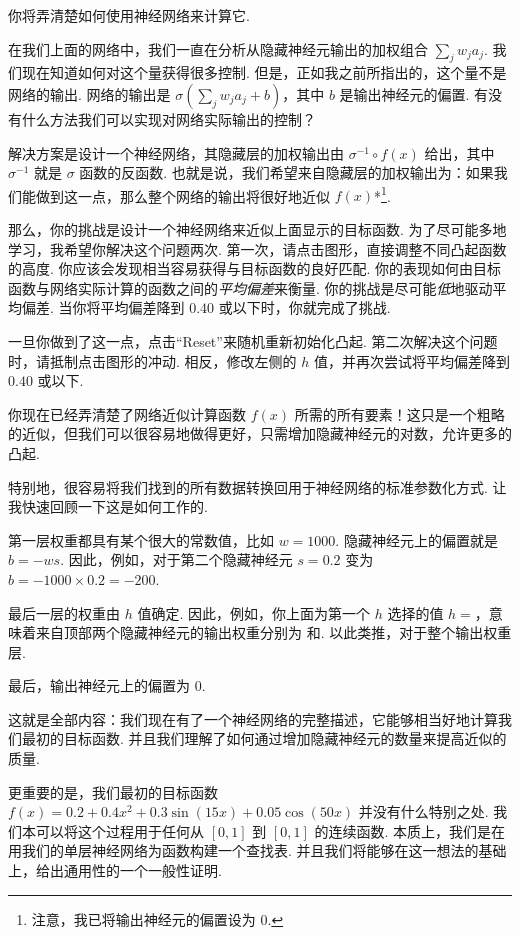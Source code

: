 你将弄清楚如何使用神经网络来计算它.

在我们上面的网络中，我们一直在分析从隐藏神经元输出的加权组合 $\sum_j w_j a_j$. 我们现在知道如何对这个量获得很多控制. 但是，正如我之前所指出的，这个量不是网络的输出. 网络的输出是 $\sigma(\sum_j w_j a_j + b)$，其中 $b$ 是输出神经元的偏置. 有没有什么方法我们可以实现对网络实际输出的控制？

解决方案是设计一个神经网络，其隐藏层的加权输出由 $\sigma^{-1} \circ f(x)$ 给出，其中 $\sigma^{-1}$ 就是 $\sigma$ 函数的反函数. 也就是说，我们希望来自隐藏层的加权输出为：如果我们能做到这一点，那么整个网络的输出将很好地近似 $f(x)$*\footnote{注意，我已将输出神经元的偏置设为 $0$.}.

那么，你的挑战是设计一个神经网络来近似上面显示的目标函数\label{term:62}. 为了尽可能多地学习，我希望你解决这个问题两次. 第一次，请点击图形，直接调整不同凸起函数的高度. 你应该会发现相当容易获得与目标函数的良好匹配. 你的表现如何由目标函数与网络实际计算的函数之间的\emph{平均偏差}来衡量. 你的挑战是尽可能\emph{低}地驱动平均偏差. 当你将平均偏差降到 $0.40$ 或以下时，你就完成了挑战.

一旦你做到了这一点，点击``Reset''来随机重新初始化凸起. 第二次解决这个问题时，请抵制点击图形的冲动. 相反，修改左侧的 $h$ 值，并再次尝试将平均偏差降到 $0.40$ 或以下.

你现在已经弄清楚了网络近似计算函数 $f(x)$ 所需的所有要素！这只是一个粗略的近似，但我们可以很容易地做得更好，只需增加隐藏神经元的对数，允许更多的凸起.

特别地，很容易将我们找到的所有数据转换回用于神经网络的标准参数化方式. 让我快速回顾一下这是如何工作的.

第一层权重都具有某个很大的常数值，比如 $w = 1000$.
隐藏神经元上的偏置就是 $b = -w s$. 因此，例如，对于第二个隐藏神经元 $s = 0.2$ 变为 $b = -1000 \times 0.2 = -200$.

最后一层的权重由 $h$ 值确定. 因此，例如，你上面为第一个 $h$ 选择的值 $h = $，意味着来自顶部两个隐藏神经元的输出权重分别为 和. 以此类推，对于整个输出权重层.

最后，输出神经元上的偏置为 $0$.

这就是全部内容：我们现在有了一个神经网络的完整描述，它能够相当好地计算我们最初的目标函数. 并且我们理解了如何通过增加隐藏神经元的数量来提高近似的质量.

更重要的是，我们最初的目标函数 $f(x) = 0.2+0.4 x^2+0.3 \sin(15 x) + 0.05 \cos(50 x)$ 并没有什么特别之处. 我们本可以将这个过程用于任何从 $[0, 1]$ 到 $[0, 1]$ 的连续函数. 本质上，我们是在用我们的单层神经网络为函数构建一个查找表. 并且我们将能够在这一想法的基础上，给出通用性的一个一般性证明.

